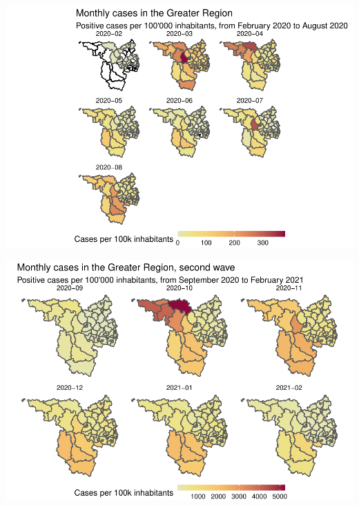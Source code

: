 \documentclass{article}
\newenvironment{Shaded}{\begin{snugshade}}{\end{snugshade}}
\newcommand{\FunctionTok}[1]{\textcolor[rgb]{0.00,0.00,0.00}{#1}}
\newcommand{\NormalTok}[1]{#1}
\newcommand{\SpecialCharTok}[1]{\textcolor[rgb]{0.00,0.00,0.00}{#1}}
\begin{document}
\begin{Shaded}
\end{Shaded}

\includegraphics[width=1\linewidth]{paper_files/figure-latex/unnamed-chunk-2-1}

\begin{Shaded}
\end{Shaded}

\includegraphics[width=1\linewidth]{paper_files/figure-latex/unnamed-chunk-3-1}
\end{document}
